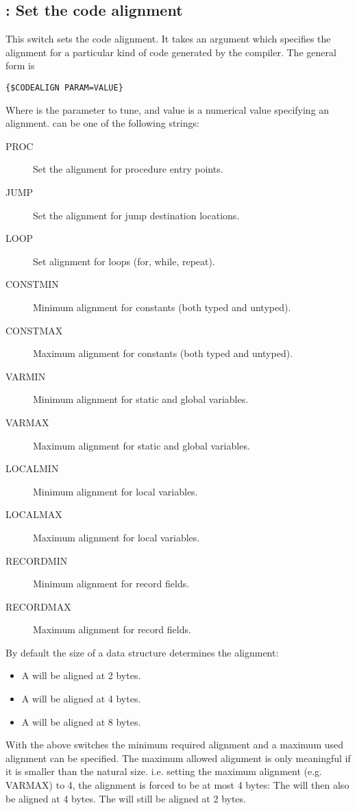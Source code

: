 \subsection{ : Set the code alignment}
This switch sets the code alignment. It takes an argument which specifies
the alignment for a particular kind of code generated by the compiler. 
The general form is
\begin{verbatim}
{$CODEALIGN PARAM=VALUE}
\end{verbatim}
Where  is the parameter to tune, and  value is a
numerical value specifying an alignment.  can be one of the
following strings:
\begin{description}
\item[PROC] Set the alignment for procedure entry points.
\item[JUMP] Set the alignment for jump destination locations.
\item[LOOP] Set alignment for loops (for, while, repeat).
\item[CONSTMIN] Minimum alignment for constants (both typed and untyped).
\item[CONSTMAX] Maximum alignment for constants (both typed and untyped).
\item[VARMIN] Minimum alignment for static and global variables.
\item[VARMAX] Maximum alignment for static and global variables.
\item[LOCALMIN] Minimum alignment for local variables.
\item[LOCALMAX] Maximum alignment for local variables.
\item[RECORDMIN] Minimum alignment for record fields.
\item[RECORDMAX] Maximum alignment for record fields.
\end{description}
By default the size of a data structure determines the alignment:
\begin{itemize}
\item A  will be aligned at 2 bytes.
\item A  will be aligned at 4 bytes.
\item A  will be aligned at 8 bytes. 
\end{itemize}
With the above switches the minimum required alignment and a maximum 
used alignment can be specified. The maximum allowed alignment is only
meaningful if it is smaller than the natural size. i.e. setting the 
maximum alignment (e.g. VARMAX) to 4, the alignment is forced to
be at most 4 bytes: The  will then also be aligned at 
4 bytes. The  will still be aligned at 2 bytes.

